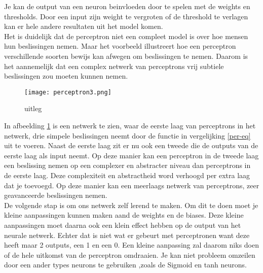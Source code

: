 \noindent Je kan de output van een neuron beinvloeden door te spelen met de weights en thresholds. Door een input zijn weight te vergroten of de threshold te verlagen kan er hele andere resultaten uit het model komen.\\ \cite{NeuralNetwork1}
\newline
Het is duidelijk dat de perceptron niet een compleet model is over hoe mensen hun beslissingen nemen. Maar het voorbeeld illustreert hoe een perceptron verschillende soorten bewijs kan afwegen om beslissingen te nemen. Daarom is het aannemelijk dat een complex netwerk van perceptrons vrij subtiele beslissingen zou moeten kunnen nemen.
\begin{figure}[h!]
\centering
\texttt{[image: perceptron3.png]}
\caption{uitleg}
\label{perceptron3}
\end{figure}
\newline
In afbeelding \ref{perceptron3} is een netwerk te zien, waar de eerste laag van perceptrons in het netwerk, drie simpele beslissingen neemt door de functie in vergelijking \ref{per-eq} uit te voeren. Naast de eerste laag zit er nu ook een tweede die de outputs van de eerste laag als input neemt. Op deze manier kan een perceptron in de tweede laag een beslissing nemen op een complexer en abstracter niveau dan perceptrons in de eerste laag. Deze complexiteit en abstractheid word verhoogd per extra laag dat je toevoegd. Op deze manier kan een meerlaags netwerk van perceptrons, zeer geavanceerde beslissingen nemen.\\ \cite{NeuralNetwork1}
\newline
De volgende stap is om ons netwerk zelf lerend te maken. Om dit te doen moet je kleine aanpassingen kunnen maken aand de weights en de biases. Deze kleine aanpassingen moet daarna ook een klein effect hebben op de output van het neurale netwerk. Echter dat is niet wat er gebeurt met perceptronen want deze heeft maar 2 outputs, een 1 en een 0. Een kleine aanpassing zal daarom niks doen of de hele uitkomst van de perceptron omdraaien. Je kan niet probleem omzeilen door een ander types neurons te gebruiken ,zoals de Sigmoid en tanh neurons.\cite{learning}

